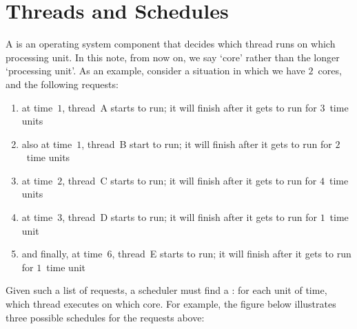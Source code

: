 


\section*{Threads and Schedules}

\noindent
A  is an operating system component
  that decides which thread runs on which processing unit.
In this note, from now on, we say `core' rather than the longer `processing unit'.
As an example,
  consider a situation in which we have $2$~cores,
  and the following requests:
\begin{enumerate}
\item at time~$1$, thread~A starts to run;
  it will finish after it gets to run for $3$~time units
\item also at time~$1$, thread~B start to run;
  it will finish after it gets to run for $2$~time units
\item at time~$2$, thread~C starts to run;
  it will finish after it gets to run for $4$~time units
\item at time~$3$, thread~D starts to run;
  it will finish after it gets to run for $1$~time unit
\item and finally, at time~$6$, thread~E starts to run;
  it will finish after it gets to run for $1$~time unit
\end{enumerate}
Given such a list of requests,
  a scheduler must find a :
  for each unit of time, which thread executes on which core.
For example,
  the figure below illustrates three possible schedules for the requests above:
\begin{center}
\end{center}
